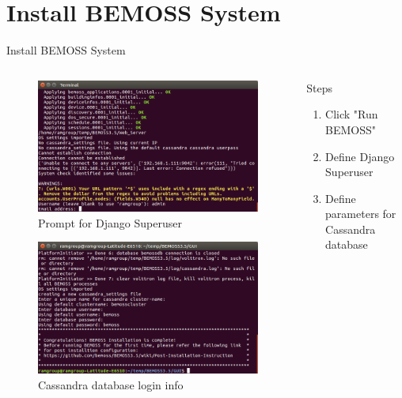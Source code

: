 \documentclass{beamer}
\begin{document}
\section{Install BEMOSS System}

\begin{frame}{Install BEMOSS System}
\begin{columns}[T]
	\begin{column}{0.5\textwidth}
		\begin{figure}
			\includegraphics[scale=0.15]{figs/djangoSuperuser.png}
			\caption{Prompt for Django Superuser}
		\end{figure}
		\begin{figure}
			\includegraphics[scale=0.15]{figs/bemossFinish.png}
			\caption{Cassandra database login info}
		\end{figure}
	\end{column}
	\begin{column}{0.5\textwidth}
		\begin{block}{Steps}
			\begin{enumerate}
				\item Click "Run BEMOSS"
				\item Define Django Superuser
				\item Define parameters for Cassandra database
			\end{enumerate}
		\end{block}
	\end{column}
\end{columns}
\end{frame}
\end{document}
